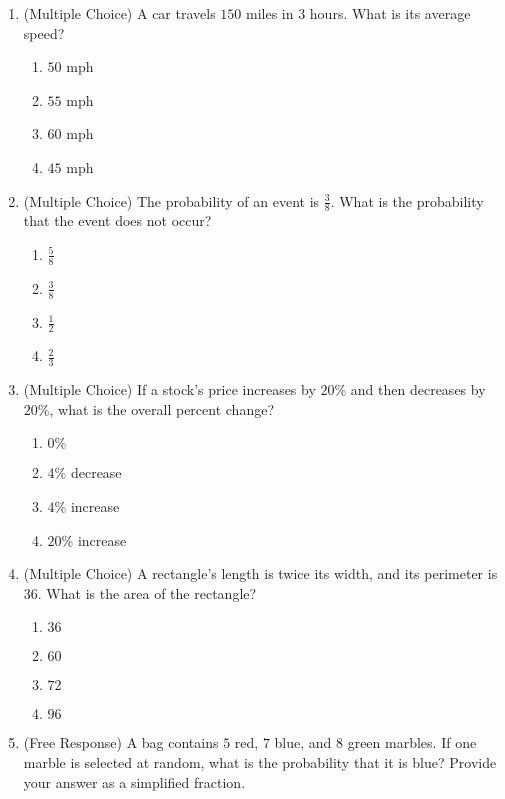 \documentclass[12pt]{article}
\begin{document}
\begin{enumerate}[label=\textbf{Question \arabic*:}]
  \item (Multiple Choice) A car travels \(150\) miles in \(3\) hours. What is its average speed?
    \begin{enumerate}[label=(\Alph*)]
      \item \(50\) mph
      \item \(55\) mph
      \item \(60\) mph
      \item \(45\) mph
    \end{enumerate}
    
  \item (Multiple Choice) The probability of an event is \(\frac{3}{8}\). What is the probability that the event does not occur?
    \begin{enumerate}[label=(\Alph*)]
      \item \(\frac{5}{8}\)
      \item \(\frac{3}{8}\)
      \item \(\frac{1}{2}\)
      \item \(\frac{2}{3}\)
    \end{enumerate}
    
  \item (Multiple Choice) If a stock's price increases by \(20\%\) and then decreases by \(20\%\), what is the overall percent change?
    \begin{enumerate}[label=(\Alph*)]
      \item \(0\%\)
      \item \(4\%\) decrease
      \item \(4\%\) increase
      \item \(20\%\) increase
    \end{enumerate}
    
  \item (Multiple Choice) A rectangle's length is twice its width, and its perimeter is \(36\). What is the area of the rectangle?
    \begin{enumerate}[label=(\Alph*)]
      \item \(36\)
      \item \(60\)
      \item \(72\)
      \item \(96\)
    \end{enumerate}
    
  \item (Free Response) A bag contains \(5\) red, \(7\) blue, and \(8\) green marbles. If one marble is selected at random, what is the probability that it is blue? Provide your answer as a simplified fraction.
    

\end{enumerate}
\end{document}
